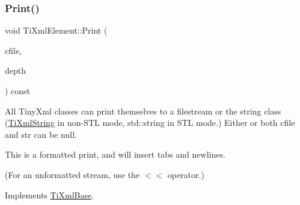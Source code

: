 \subsubsection{\texorpdfstring{Print()}{Print()}}
{\footnotesize\ttfamily void Ti\+Xml\+Element\+::\+Print (\begin{DoxyParamCaption}\item[{F\+I\+LE $\ast$}]{cfile,  }\item[{int}]{depth }\end{DoxyParamCaption}) const\hspace{0.3cm}{\ttfamily [virtual]}}

All Tiny\+Xml classes can print themselves to a filestream or the string class (\hyperlink{class_ti_xml_string}{Ti\+Xml\+String} in non-\/\+S\+TL mode, std\+::string in S\+TL mode.) Either or both cfile and str can be null.

This is a formatted print, and will insert tabs and newlines.

(For an unformatted stream, use the $<$$<$ operator.) 

Implements \hyperlink{class_ti_xml_base_a0de56b3f2ef14c65091a3b916437b512}{Ti\+Xml\+Base}.

